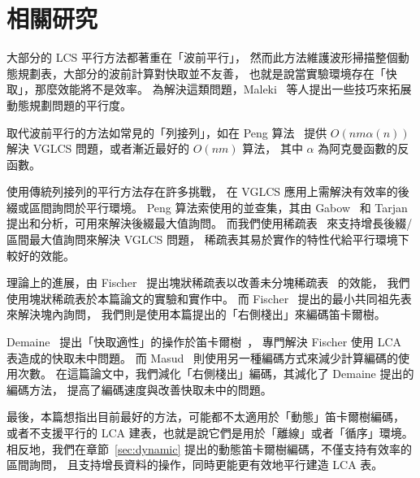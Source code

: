 \section{相關研究} \label{sec:RelatedWork}

大部分的 LCS 平行方法都著重在「波前平行」，
然而此方法維護波形掃描整個動態規劃表，大部分的波前計算對快取並不友善，
也就是說當實驗環境存在「快取」，那麼效能將不是效率。
為解決這類問題，Maleki~\cite{Maleki2016EfficientPU} 
等人提出一些技巧來拓展動態規劃問題的平行度。

取代波前平行的方法如常見的「列接列」，如在 Peng 算法~\cite{Peng2011TheLC} 
提供 $O(nm \alpha(n))$ 解決 VGLCS 問題，或者漸近最好的 $O(nm)$ 算法，
其中 $\alpha$ 為阿克曼函數的反函數。

使用傳統列接列的平行方法存在許多挑戰，
在 VGLCS 應用上需解決有效率的後綴或區間詢問於平行環境。
Peng 算法索使用的並查集，其由 Gabow~\cite{Gabow1983ALA} 和 
Tarjan~\cite{Tarjan1975EfficiencyOA} 提出和分析，可用來解決後綴最大值詢問。
而我們使用稀疏表~\cite{Berkman1993RecursiveSP} 來支持增長後綴/區間最大值詢問來解決 VGLCS 問題，
稀疏表其易於實作的特性代給平行環境下較好的效能。

理論上的進展，由 Fischer~\cite{Fischer2006TheoreticalAP} 
提出塊狀稀疏表以改善未分塊稀疏表~\cite{Berkman1993RecursiveSP} 的效能，
我們使用塊狀稀疏表於本篇論文的實驗和實作中。
而 Fischer~\cite{Fischer2006TheoreticalAP} 提出的最小共同祖先表來解決塊內詢問，
我們則是使用本篇提出的「右側棧出」來編碼笛卡爾樹。

Demaine~\cite{Demaine2009OnCT} 提出「快取適性」的操作於笛卡爾樹~\cite{Vuillemin1980AUL}，
專門解決 Fischer 使用 LCA 表造成的快取未中問題。
而 Masud~\cite{Hasan2010CacheOA} 則使用另一種編碼方式來減少計算編碼的使用次數。
在這篇論文中，我們減化「右側棧出」編碼，其減化了 Demaine 提出的編碼方法，
提高了編碼速度與改善快取未中的問題。

最後，本篇想指出目前最好的方法，可能都不太適用於「動態」笛卡爾樹編碼，
或者不支援平行的 LCA 建表，也就是說它們是用於「離線」或者「循序」環境。
相反地，我們在章節~\ref{sec:dynamic} 提出的動態笛卡爾樹編碼，不僅支持有效率的區間詢問，
且支持增長資料的操作，同時更能更有效地平行建造 LCA 表。